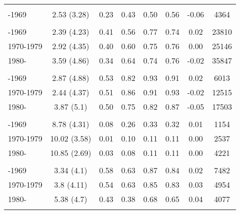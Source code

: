 \begin{ThreePartTable}
\begin{longtable}[t]{lccccccc}
\addlinespace[0.3em]
\multicolumn{8}{l}{\textbf{Rwanda}}\\
\hspace{1em}-1969 & 2.53 (3.28) & 0.23 & 0.43 & 0.50 & 0.56 & -0.06 & 4364\\
\addlinespace[0.3em]
\multicolumn{8}{l}{\textbf{Senegal}}\\
\hspace{1em}-1969 & 2.39 (4.23) & 0.41 & 0.56 & 0.77 & 0.74 & 0.02 & 23810\\
\hspace{1em}1970-1979 & 2.92 (4.35) & 0.40 & 0.60 & 0.75 & 0.76 & 0.00 & 25146\\
\hspace{1em}1980- & 3.59 (4.86) & 0.34 & 0.64 & 0.74 & 0.76 & -0.02 & 35847\\
\addlinespace[0.3em]
\multicolumn{8}{l}{\textbf{Sierra Leone}}\\
\hspace{1em}-1969 & 2.87 (4.88) & 0.53 & 0.82 & 0.93 & 0.91 & 0.02 & 6013\\
\hspace{1em}1970-1979 & 2.44 (4.37) & 0.51 & 0.86 & 0.91 & 0.93 & -0.02 & 12515\\
\hspace{1em}1980- & 3.87 (5.1) & 0.50 & 0.75 & 0.82 & 0.87 & -0.05 & 17503\\
\addlinespace[0.3em]
\multicolumn{8}{l}{\textbf{South Africa}}\\
\hspace{1em}-1969 & 8.78 (4.31) & 0.08 & 0.26 & 0.33 & 0.32 & 0.01 & 1154\\
\hspace{1em}1970-1979 & 10.02 (3.58) & 0.01 & 0.10 & 0.11 & 0.11 & 0.00 & 2537\\
\hspace{1em}1980- & 10.85 (2.69) & 0.03 & 0.08 & 0.11 & 0.11 & 0.00 & 4221\\
\addlinespace[0.3em]
\multicolumn{8}{l}{\textbf{Togo}}\\
\hspace{1em}-1969 & 3.34 (4.1) & 0.58 & 0.63 & 0.87 & 0.84 & 0.02 & 7482\\
\hspace{1em}1970-1979 & 3.8 (4.11) & 0.54 & 0.63 & 0.85 & 0.83 & 0.03 & 4954\\
\hspace{1em}1980- & 5.38 (4.7) & 0.43 & 0.38 & 0.68 & 0.65 & 0.04 & 4077\\
\addlinespace[0.3em]
\multicolumn{8}{l}{\textbf{Uganda}}\\

\end{longtable}
\end{ThreePartTable}
